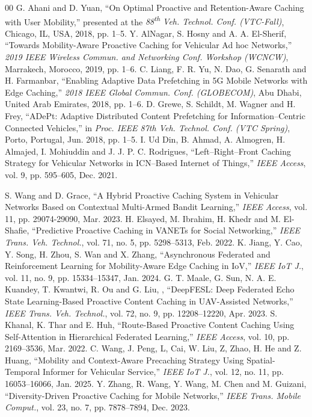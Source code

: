 \documentclass[journal]{IEEEtran}
\begin{document}
\begin{thebibliography}{00}
 G. Ahani and D. Yuan, ``On Optimal Proactive and Retention-Aware Caching with User Mobility,'' presented at the \emph{88\textsuperscript{th} Veh. Technol. Conf. (VTC-Fall)}, Chicago, IL, USA, 2018, pp. 1--5.
 Y. AlNagar, S. Hosny and A. A. El-Sherif, ``Towards Mobility-Aware Proactive Caching for Vehicular Ad hoc Networks,'' \emph{2019 IEEE Wireless Commun. and Networking Conf. Workshop (WCNCW)}, Marrakech, Morocco, 2019, pp. 1--6.
 C. Liang, F. R. Yu, N. Dao, G. Senarath and H. Farmanbar, ``Enabling Adaptive Data Prefetching in 5G Mobile Networks with Edge Caching,'' \emph{2018 IEEE Global Commun. Conf. (GLOBECOM)}, Abu Dhabi, United Arab Emirates, 2018, pp. 1--6.
 D. Grewe, S. Schildt, M. Wagner and H. Frey, ``ADePt: Adaptive Distributed Content Prefetching for Information--Centric Connected Vehicles,'' in \emph{Proc. IEEE 87th Veh. Technol. Conf. (VTC Spring)}, Porto, Portugal, Jun. 2018, pp. 1--5.
 I. Ud Din, B. Ahmad, A. Almogren, H. Almajed, I. Mohiuddin and J. J. P. C. Rodrigues, ``Left--Right--Front Caching Strategy for Vehicular Networks in ICN--Based Internet of Things,'' \emph{IEEE Access}, vol. 9, pp. 595--605, Dec. 2021.

 S. Wang and D. Grace, ``A Hybrid Proactive Caching System in Vehicular Networks Based on Contextual Multi-Armed Bandit Learning,'' \emph{IEEE Access},  vol. 11, pp. 29074-29090, Mar. 2023.
 H. Elsayed, M. Ibrahim, H. Khedr and M. El-Shafie, ``Predictive Proactive Caching in VANETs for Social Networking,'' \emph{ IEEE Trans. Veh. Technol.}, vol. 71, no. 5, pp. 5298--5313, Feb. 2022.
 K. Jiang, Y. Cao, Y. Song, H. Zhou, S. Wan and X. Zhang, ``Asynchronous Federated and Reinforcement Learning for Mobility-Aware Edge Caching in IoV,'' \emph{IEEE IoT J.}, vol. 11, no. 9, pp. 15334--15347, Jan. 2024.
 G. T. Maale, G. Sun, N. A. E. Kuandey, T. Kwantwi, R. Ou and G. Liu, , ``DeepFESL: Deep Federated Echo State Learning-Based Proactive Content Caching in UAV-Assisted Networks,'' \emph{IEEE Trans. Veh. Technol.}, vol. 72, no. 9, pp. 12208--12220, Apr. 2023.
 S. Khanal, K. Thar and E. Huh, ``Route-Based Proactive Content Caching Using Self-Attention in Hierarchical Federated Learning,'' \emph{IEEE Access}, vol. 10, pp. 2169--3536, Mar. 2022.
 C. Wang, J. Peng, L, Cai, W. Liu, Z, Zhao, H. He and Z. Huang, ``Mobility and Context-Aware Precaching Strategy Using Spatial-Temporal Informer for Vehicular Service,'' \emph{IEEE IoT J.}, vol. 12, no. 11, pp. 16053--16066, Jan. 2025.
 Y. Zhang, R. Wang, Y. Wang, M. Chen and M. Guizani, ``Diversity-Driven Proactive Caching for Mobile Networks,'' \emph{IEEE Trans. Mobile Comput.}, vol. 23, no. 7, pp. 7878--7894, Dec. 2023.


\end{thebibliography}
\end{document}
